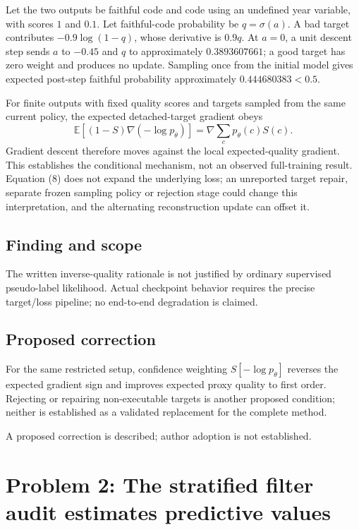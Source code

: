 \documentclass[11pt]{article}
\begin{document}
Let the two outputs be faithful code and code using an undefined year variable, with scores \(1\) and \(0.1\). Let faithful-code probability be \(q=\sigma(a)\). A bad target contributes \(-0.9\log(1-q)\), whose derivative is \(0.9q\). At \(a=0\), a unit descent step sends \(a\) to \(-0.45\) and \(q\) to approximately \(0.3893607661\); a good target has zero weight and produces no update. Sampling once from the initial model gives expected post-step faithful probability approximately \(0.444680383<0.5\).

For finite outputs with fixed quality scores and targets sampled from the same current policy, the expected detached-target gradient obeys \[\mathbb E[(1-S)\nabla(-\log p_\theta)]=\nabla\sum_c p_\theta(c)S(c).\] Gradient descent therefore moves against the local expected-quality gradient. This establishes the conditional mechanism, not an observed full-training result. Equation (8) does not expand the underlying loss; an unreported target repair, separate frozen sampling policy or rejection stage could change this interpretation, and the alternating reconstruction update can offset it.

\subsection*{Finding and scope}

The written inverse-quality rationale is not justified by ordinary supervised pseudo-label likelihood. Actual checkpoint behavior requires the precise target/loss pipeline; no end-to-end degradation is claimed.

\subsection*{Proposed correction}

For the same restricted setup, confidence weighting \(S[-\log p_\theta]\) reverses the expected gradient sign and improves expected proxy quality to first order. Rejecting or repairing non-executable targets is another proposed condition; neither is established as a validated replacement for the complete method.

A proposed correction is described; author adoption is not established.

\section*{Problem 2: The stratified filter audit estimates predictive values}
\end{document}
